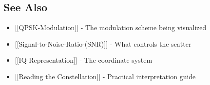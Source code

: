 \subsection{See Also}\label{see-also}

\begin{itemize}
\tightlist
\item
  {[}{[}QPSK-Modulation{]}{]} - The modulation scheme being visualized
\item
  {[}{[}Signal-to-Noise-Ratio-(SNR){]}{]} - What controls the scatter
\item
  {[}{[}IQ-Representation{]}{]} - The coordinate system
\item
  {[}{[}Reading the Constellation{]}{]} - Practical interpretation guide
\end{itemize}
